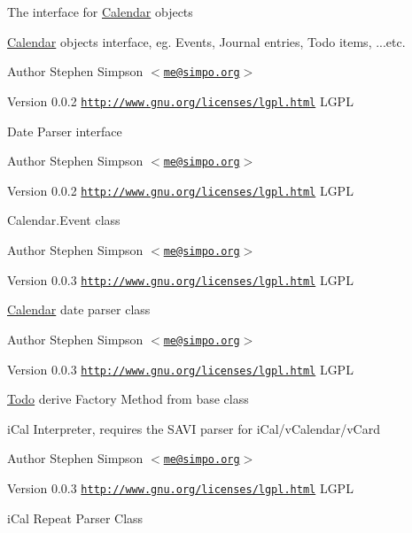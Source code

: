 The interface for \hyperlink{namespaceCalendar}{Calendar} objects

\hyperlink{namespaceCalendar}{Calendar} objects interface, eg. Events, Journal entries, Todo items, ...etc.

\begin{DoxyAuthor}{Author}
Stephen Simpson $<$\href{mailto:me@simpo.org}{\tt me@simpo.org}$>$ 
\end{DoxyAuthor}
\begin{DoxyVersion}{Version}
0.0.2  \href{http://www.gnu.org/licenses/lgpl.html}{\tt http://www.gnu.org/licenses/lgpl.html} LGPL
\end{DoxyVersion}
Date Parser interface

\begin{DoxyAuthor}{Author}
Stephen Simpson $<$\href{mailto:me@simpo.org}{\tt me@simpo.org}$>$ 
\end{DoxyAuthor}
\begin{DoxyVersion}{Version}
0.0.2  \href{http://www.gnu.org/licenses/lgpl.html}{\tt http://www.gnu.org/licenses/lgpl.html} LGPL
\end{DoxyVersion}
Calendar.Event class

\begin{DoxyAuthor}{Author}
Stephen Simpson $<$\href{mailto:me@simpo.org}{\tt me@simpo.org}$>$ 
\end{DoxyAuthor}
\begin{DoxyVersion}{Version}
0.0.3  \href{http://www.gnu.org/licenses/lgpl.html}{\tt http://www.gnu.org/licenses/lgpl.html} LGPL
\end{DoxyVersion}
\hyperlink{namespaceCalendar}{Calendar} date parser class

\begin{DoxyAuthor}{Author}
Stephen Simpson $<$\href{mailto:me@simpo.org}{\tt me@simpo.org}$>$ 
\end{DoxyAuthor}
\begin{DoxyVersion}{Version}
0.0.3  \href{http://www.gnu.org/licenses/lgpl.html}{\tt http://www.gnu.org/licenses/lgpl.html} LGPL
\end{DoxyVersion}
\begin{Desc}
\item[\hyperlink{todo__todo000008}{Todo}]derive Factory Method from base class \end{Desc}


iCal Interpreter, requires the SAVI parser for iCal/vCalendar/vCard

\begin{DoxyAuthor}{Author}
Stephen Simpson $<$\href{mailto:me@simpo.org}{\tt me@simpo.org}$>$ 
\end{DoxyAuthor}
\begin{DoxyVersion}{Version}
0.0.3  \href{http://www.gnu.org/licenses/lgpl.html}{\tt http://www.gnu.org/licenses/lgpl.html} LGPL
\end{DoxyVersion}
iCal Repeat Parser Class

